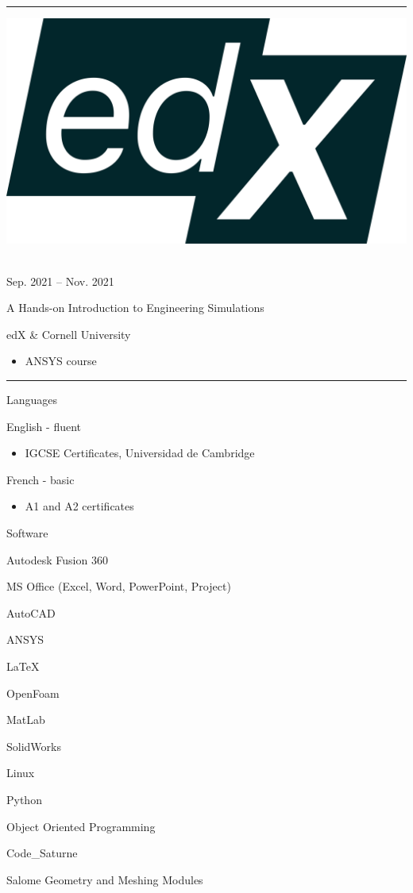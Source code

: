 \documentclass[a4paper,10pt]{article}
\newlength{\cvcolumngapwidth}
\newlength{\cvleftcolumnwidth}
\newlength{\cvrightcolumnwidth}
\newcommand{\cvsectionstyle}[1]{{\normalsize\cvsectionfont\textcolor{cvsectioncolor}{#1}}}
\newcommand{\cvtitlestyle}[1]{{\large\cvtitlefont\textcolor{cvtitlecolor}{#1}}}
\newcommand{\cvdurationstyle}[1]{{\small\cvdurationfont\textcolor{cvdurationcolor}{#1}}}
\newcommand{\cvheadingstyle}[1]{{\normalsize\cvheadingfont\textcolor{cvheadingcolor}{#1}}}
\newlength{\cvafteritemskipamount}
\newlength{\cvaftersectionskipamount}
\newlength{\cvbetweensectionandheadingextraskipamount}
\newlength{\cvaftertitleskipamount}
\newlength{\cvparskip}
\newcommand{\cvsection}[1]{
    \begin{minipage}[t]{\cvleftcolumnwidth}
        \raggedleft\cvsectionstyle{#1}
    \end{minipage}%
    \hspace{\cvcolumngapwidth}%
    \begin{minipage}[t]{\cvrightcolumnwidth}
        \textcolor{cvrulecolor}{\rule{\cvrightcolumnwidth}{0.3mm}}
    \end{minipage}

    \vspace{\cvaftersectionskipamount}
}
\newcommand{\cvitem}[2]{
    \begin{minipage}[t]{\cvleftcolumnwidth}
        \raggedleft #1
    \end{minipage}%
    \hspace{\cvcolumngapwidth}%
    \begin{minipage}[t]{\cvrightcolumnwidth}
        \setlength{\parskip}{\cvparskip} #2
    \end{minipage}

    \vspace{\cvafteritemskipamount}
}
\newcommand{\cvtitle}[1]{
    \cvtitlestyle{#1}

    \vspace{\cvaftertitleskipamount}
    \vspace{-\cvparskip}
}
\begin{document}
\cvsection{COURSES}

\cvitem{
    \begin{minipage}{\textwidth}
        \flushright
        \includegraphics[height=0.15\textwidth]{../logos-photos/Logo_edx.png}   
    \end{minipage}\\
    \vspace{0.1cm}
    \cvdurationstyle{Sep. 2021 -- Nov. 2021}
}{
    \cvtitle{A Hands-on Introduction to Engineering Simulations}
    edX \& Cornell University

    \begin{itemize}
        \item ANSYS course
    \end{itemize}
}
\cvsection{SKILLS}

\vspace{\cvbetweensectionandheadingextraskipamount}

\cvitem{
    \cvheadingstyle{Languages}
}{
    English - fluent 
    \begin{itemize}
        \item IGCSE Certificates, Universidad de Cambridge
    \end{itemize}

    French -  basic
    \begin{itemize}
        \item A1 and A2 certificates
    \end{itemize}
}

\cvitem{
    \cvheadingstyle{Software}
}{
    Autodesk Fusion 360
    
    MS Office (Excel, Word, PowerPoint, Project)

    AutoCAD
    
    ANSYS
    
    LaTeX 
    
    OpenFoam

    MatLab

    SolidWorks

    Linux

    Python

    Object Oriented Programming

    Code\_Saturne

    Salome Geometry and Meshing Modules
}
\end{document}

